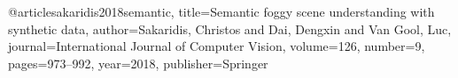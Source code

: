 @article{sakaridis2018semantic,
  title={Semantic foggy scene understanding with synthetic data},
  author={Sakaridis, Christos and Dai, Dengxin and Van Gool, Luc},
  journal={International Journal of Computer Vision},
  volume={126},
  number={9},
  pages={973--992},
  year={2018},
  publisher={Springer}
}

